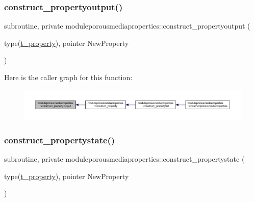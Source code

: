 \subsubsection{\texorpdfstring{construct\+\_\+propertyoutput()}{construct\_propertyoutput()}}
{\footnotesize\ttfamily subroutine, private moduleporousmediaproperties\+::construct\+\_\+propertyoutput (\begin{DoxyParamCaption}\item[{type(\mbox{\hyperlink{structmoduleporousmediaproperties_1_1t__property}{t\+\_\+property}}), pointer}]{New\+Property }\end{DoxyParamCaption})\hspace{0.3cm}{\ttfamily [private]}}

Here is the caller graph for this function\+:\nopagebreak
\begin{figure}[H]
\begin{center}
\leavevmode
\includegraphics[width=350pt]{namespacemoduleporousmediaproperties_acd8b0a3775ea88f8c55b0a2d1eaa957f_icgraph}
\end{center}
\end{figure}
\mbox{\label{namespacemoduleporousmediaproperties_a401ffa0cf421489bbc331e312e10ebd2}} 
\subsubsection{\texorpdfstring{construct\+\_\+propertystate()}{construct\_propertystate()}}
{\footnotesize\ttfamily subroutine, private moduleporousmediaproperties\+::construct\+\_\+propertystate (\begin{DoxyParamCaption}\item[{type(\mbox{\hyperlink{structmoduleporousmediaproperties_1_1t__property}{t\+\_\+property}}), pointer}]{New\+Property }\end{DoxyParamCaption})\hspace{0.3cm}{\ttfamily [private]}}

